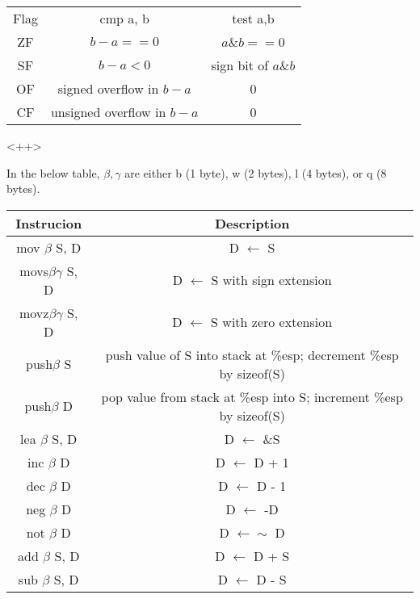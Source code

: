 \documentclass[11pt]{article}
\begin{document}
\begin{tabular}{|c|c|c|}
Flag & cmp a, b                     & test a,b              \\
ZF   & $b - a == 0$                 & $a \& b == 0$         \\
SF   & $b - a <  0$                 & sign bit of $a \& b$  \\
OF   & signed overflow in $b - a$   & 0                     \\
CF   & unsigned overflow in $b - a$ & 0                     \\
\end{tabular}<++>

In the below table, $\beta,\gamma$ are either b (1 byte), w (2 bytes),
l (4 bytes), or q (8 bytes). \\
\begin{tabular}{|c|c|}
\hline
Instrucion             & Description                                                        \\
\hline
mov $\beta$       S, D & D $\leftarrow$ S                                                   \\
movs$\beta\gamma$ S, D & D $\leftarrow$ S with sign extension                               \\
movz$\beta\gamma$ S, D & D $\leftarrow$ S with zero extension                               \\
\hline
push$\beta$       S    & push value of S into stack at \%esp; decrement \%esp by sizeof(S)  \\
push$\beta$          D & pop value from stack at \%esp into S; increment \%esp by sizeof(S) \\
\hline
lea $\beta$       S, D & D $\leftarrow$ \&S                                                 \\
\hline
inc $\beta$          D & D $\leftarrow$ D + 1                                               \\
dec $\beta$          D & D $\leftarrow$ D - 1                                               \\
neg $\beta$          D & D $\leftarrow$ -D                                                  \\
not $\beta$          D & D $\leftarrow \sim$ D                                              \\
\hline
add $\beta$       S, D & D $\leftarrow$ D + S                                               \\
sub $\beta$       S, D & D $\leftarrow$ D - S                                               \\

\end{tabular}
\end{document}
